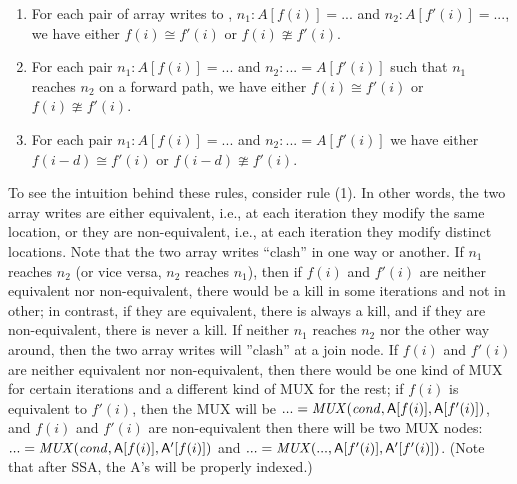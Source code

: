 \documentclass[sigconf, screen, natbib=false, dvipsnames, table]{acmart}
\theoremstyle{definition}
\begin{document}
\begin{enumerate}
\item For each pair of array writes to \A, $n_1\!: A[f(i)] = ... $ and $n_2\!: A[f'(i)] = ... $, we have either $f(i) \cong f'(i)$ or 
$f(i) \ncong f'(i)$. 

\item For each pair $n_1\!: A[f(i)] = ... $ and $n_2\!: ... = A[f'(i)]$ such that $n_1$ reaches $n_2$ on a forward path, 
we have either $f(i) \cong f'(i)$ or $f(i) \ncong f'(i)$. 


\item For each pair $n_1\!: A[f(i)] = ... $ and $n_2\!: ... = A[f'(i)]$ %
we have either $f(i-d) \cong f'(i)$ or $f(i-d) \ncong f'(i)$. 

\end{enumerate}

To see the intuition behind these rules, consider rule (1). 
In other words, the two array writes are either equivalent, i.e., at each iteration they modify the same
location, or they are non-equivalent, i.e., at each iteration they modify distinct locations. Note that the two array writes
``clash'' in one way or another. If $n_1$ reaches $n_2$ (or vice versa, $n_2$ reaches $n_1$), then if $f(i)$ and $f'(i)$ 
are neither equivalent nor non-equivalent, there would be a kill in some iterations and not in other; in contrast, if
they are equivalent, there is always a kill, and if they are non-equivalent, there is never a kill. If neither $n_1$ reaches
$n_2$ nor the other way around, then the two array writes will ''clash'' at a join node. If $f(i)$ and $f'(i)$ are neither 
equivalent nor non-equivalent, then there would be one kind of MUX for certain iterations and a different kind of MUX 
for the rest; if $f(i)$ is equivalent to $f'(i)$, then the MUX will be $... = \mathit{MUX}(\mathit{cond}, {{\sf A}}[f(i)], {{\sf A}[f'(i)]})$, and 
$f(i)$ and $f'(i)$ are non-equivalent then there will be two MUX nodes: $... = \mathit{MUX}(\mathit{cond}, {{\sf A}}[f(i)], {{\sf A}'[f(i)]})$
and $... = \mathit{MUX}(..., {{\sf A}}[f'(i)], {{\sf A}'[f'(i)]})$. (Note that after SSA, the A's will be properly indexed.)
\end{document}
